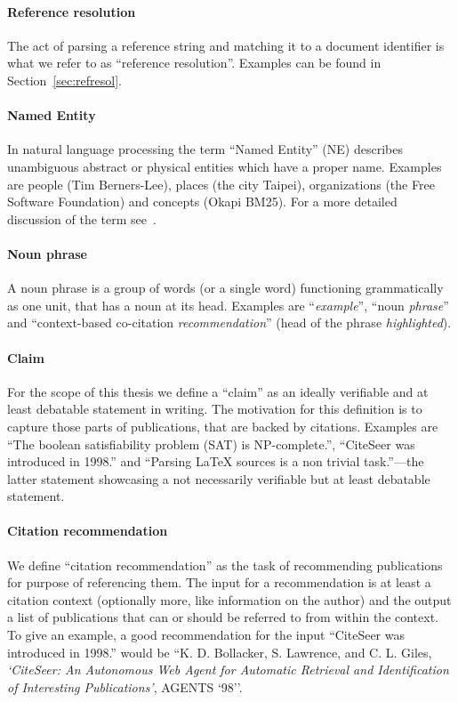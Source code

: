 \paragraph{Reference resolution} The act of parsing a reference string and matching it to a document identifier is what we refer to as ``reference resolution''. Examples can be found in Section~\ref{sec:refresol}.
\paragraph{Named Entity} In natural language processing the term ``Named Entity'' (NE) describes unambiguous abstract or physical entities which have a proper name. Examples are people (Tim Berners-Lee), places (the city Taipei), organizations (the Free Software Foundation) and concepts (Okapi BM25). For a more detailed discussion of the term see~\cite{Nadeau2007}.
\paragraph{Noun phrase} A noun phrase is a group of words (or a single word) functioning grammatically as one unit, that has a noun at its head. Examples are ``\emph{example}'', ``noun \emph{phrase}'' and ``context-based co-citation \emph{recommendation}'' (head of the phrase \emph{highlighted}).
\paragraph{Claim} For the scope of this thesis we define a ``claim'' as an ideally verifiable and at least debatable statement in writing. The motivation for this definition is to capture those parts of publications, that are backed by citations. Examples are ``The boolean satisfiability problem (SAT) is NP-complete.'', ``CiteSeer was introduced in 1998.'' and ``Parsing \LaTeX{} sources is a non trivial task.''---the latter statement showcasing a not necessarily verifiable but at least debatable statement.
\paragraph{Citation recommendation} We define ``citation recommendation'' as the task of recommending publications for purpose of referencing them. The input for a recommendation is at least a citation context (optionally more, like information on the author) and the output a list of publications that can or should be referred to from within the context. To give an example, a good recommendation for the input ``CiteSeer was introduced in 1998.'' would be ``K. D. Bollacker, S. Lawrence, and C. L. Giles, \emph{`CiteSeer: An Autonomous Web Agent for Automatic Retrieval and Identification of Interesting Publications'}, AGENTS `98''.

